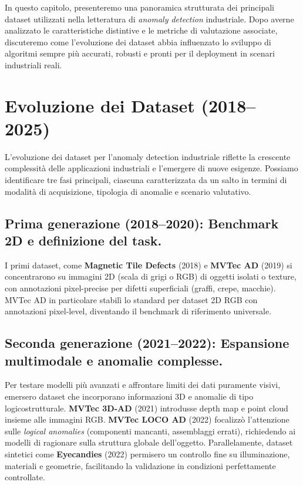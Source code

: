 In questo capitolo, presenteremo una panoramica strutturata dei principali dataset utilizzati nella letteratura di \emph{anomaly detection} industriale. Dopo a\-ver\-ne analizzato le caratteristiche distintive e le metriche di valutazione associate, discuteremo come l'evoluzione dei dataset abbia influenzato lo sviluppo di algoritmi sempre più accurati, robusti e pronti per il deployment in scenari industriali reali.

\section{Evoluzione dei Dataset (2018–2025)}
\label{sec:evoluzione_dataset}

L'evoluzione dei dataset per l'anomaly detection industriale riflette la crescente complessità delle applicazioni industriali e l'emergere di nuove esigenze. Possiamo identificare tre fasi principali, ciascuna caratterizzata da un salto in termini di modalità di acquisizione, tipologia di anomalie e scenario valutativo.

\subsection{Prima generazione (2018–2020): Benchmark 2D e definizione del task.}
I primi dataset, come \textbf{Magnetic Tile Defects} (2018) \cite{huang2018surface} e \textbf{MVTec AD} (2019) \cite{bergmann2019mvtec} si concentrarono su immagini 2D (scala di grigi o RGB) di oggetti isolati o texture, con annotazioni pixel-precise per difetti superficiali (graffi, crepe, macchie). MVTec AD in particolare stabilì lo standard per dataset 2D RGB con annotazioni pixel-level, diventando il benchmark di riferimento universale.


\subsection{Seconda generazione (2021–2022): Espansione mul\-ti\-mo\-da\-le e anomalie complesse.}
Per testare modelli più avanzati e affrontare limiti dei dati puramente visivi, emersero dataset che incorporano informazioni 3D e anomalie di tipo logico\-strutturale. \textbf{MVTec 3D-AD} (2021) \cite{bergmann2021mvtec3d} introdusse depth map e point cloud insieme alle immagini RGB. \textbf{MVTec LOCO AD} (2022) \cite{bergmann2022beyond} focalizzò l'at\-ten\-zio\-ne sulle \textit{logical anomalies} (componenti mancanti, assemblaggi errati), ri\-chie\-den\-do ai modelli di ragionare sulla struttura globale dell'oggetto. Parallelamente, dataset sintetici come \textbf{Eyecandies} (2022) \cite{bonfiglioli2022eyecandies} permisero un controllo fine su illuminazione, materiali e geometrie, facilitando la validazione in condizioni perfettamente controllate.

